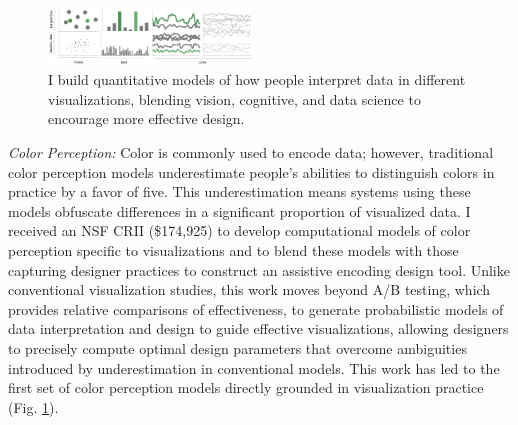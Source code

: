 \documentclass[11pt]{article}
\begin{document}
\begin{figure}
	\begin{center}
		\includegraphics[width=0.48\textwidth]{teaserOne.pdf}
	\end{center}
	\caption{I build quantitative models of how people interpret data in different visualizations, blending vision, cognitive, and data science to encourage more effective design.}\label{color}
\end{figure}

\emph{Color Perception: } Color is commonly used to encode data; however, traditional color perception models underestimate people's abilities to distinguish colors in practice by a favor of five. This underestimation means systems using these models obfuscate differences in a significant proportion of visualized data. %
I received an NSF CRII (\$174,925) to 
develop computational models of color perception specific to visualizations and to blend these models with those capturing designer practices to construct an assistive encoding design tool.
Unlike conventional visualization studies, this work moves beyond A/B testing, which provides relative comparisons of effectiveness, to generate probabilistic models of data interpretation and design to guide effective visualizations, allowing designers to precisely compute optimal design parameters that overcome ambiguities introduced by underestimation in conventional models. 
This work has led to the first set of color perception models directly grounded in visualization practice
\cite{szafir2018Modeling} (Fig. \ref{color}). %
\end{document}
